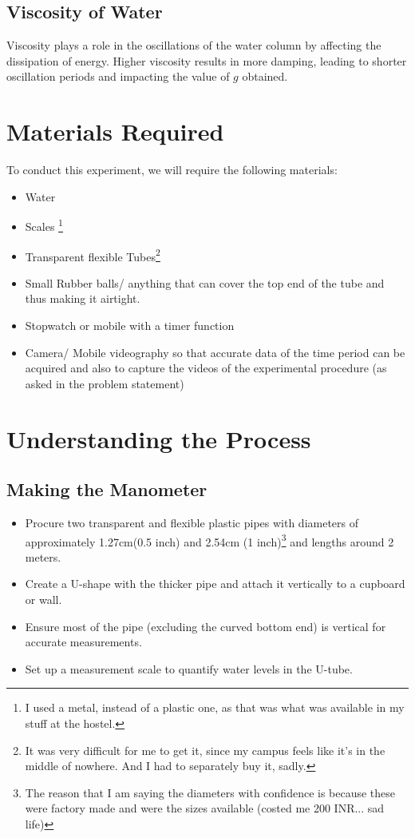 \documentclass[twocolumn,11pt]{article}
\begin{document}
\subsection{Viscosity of Water}
Viscosity plays a role in the oscillations of the water column by affecting the dissipation of energy. Higher viscosity results in more damping, leading to shorter oscillation periods and impacting the value of $g$ obtained.

\section{Materials Required}

To conduct this experiment, we will require the following materials:
\begin{itemize}
    \item Water
    \item Scales \footnote{I used a metal, instead of a plastic one, as that was what was available in my stuff at the hostel.}
    \item Transparent flexible Tubes\footnote{It was very difficult for me to get it, since my campus feels like it's in the middle of nowhere. And I had to separately buy it, sadly.} 
    \item Small Rubber balls/ anything that can cover the top end of the tube and thus making it airtight.
    \item Stopwatch or mobile with a timer function
    \item Camera/ Mobile videography so that accurate data of the time period can be acquired and also to capture the videos of the experimental procedure (as asked in the problem statement)
\end{itemize}

\section{Understanding the Process}
\subsection{Making the Manometer}
\begin{itemize}
    \item Procure two transparent and flexible plastic pipes with diameters of approximately 1.27cm(0.5 inch) and 2.54cm (1 inch)\footnote{The reason that I am saying the diameters with confidence is because these were factory made and were the sizes available (costed me 200 INR... sad life)} and lengths around 2 meters.
    \item Create a U-shape with the thicker pipe and attach it vertically to a cupboard or wall.
    \item Ensure most of the pipe (excluding the curved bottom end) is vertical for accurate measurements.
    \item Set up a measurement scale to quantify water levels in the U-tube.
\end{itemize}
\end{document}
